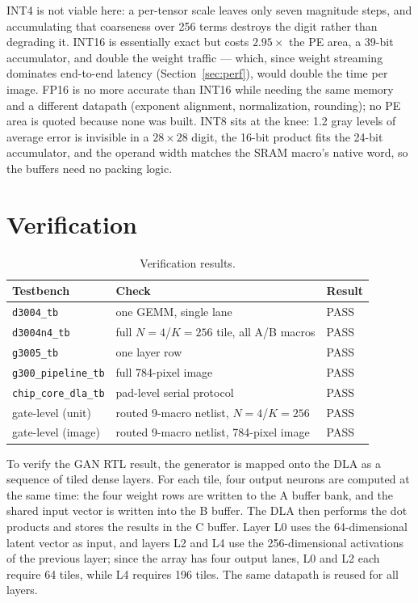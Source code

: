 \documentclass[conference,a4paper]{APSIPA2026}
\begin{document}
INT4 is not viable here: a per-tensor scale leaves only seven magnitude steps, and accumulating that coarseness over 256 terms destroys the digit rather than degrading it. INT16 is essentially exact but costs $2.95\times$ the PE area, a 39-bit accumulator, and double the weight traffic --- which, since weight streaming dominates end-to-end latency (Section~\ref{sec:perf}), would double the time per image. FP16 is no more accurate than INT16 while needing the same memory and a different datapath (exponent alignment, normalization, rounding); no PE area is quoted because none was built. INT8 sits at the knee: 1.2 gray levels of average error is invisible in a $28\times28$ digit, the 16-bit product fits the 24-bit accumulator, and the operand width matches the SRAM macro's native word, so the buffers need no packing logic.

\section{Verification}\label{sec:map}

\begin{table}[!ht]
\caption{Verification results.}
\label{tab:verif}
\centering
\renewcommand{\arraystretch}{1.08}
\begin{tabular}{@{}lll@{}}
\toprule
Testbench & Check & Result \\
\midrule
\texttt{d3004\_tb} & one GEMM, single lane & PASS \\
\texttt{d3004n4\_tb} & full $N{=}4$/$K{=}256$ tile, all A/B macros & PASS \\
\texttt{g3005\_tb} & one layer row & PASS \\
\texttt{g300\_pipeline\_tb} & full 784-pixel image & PASS \\
\texttt{chip\_core\_dla\_tb} & pad-level serial protocol & PASS \\
gate-level (unit) & routed 9-macro netlist, $N{=}4$/$K{=}256$ & PASS \\
gate-level (image) & routed 9-macro netlist, 784-pixel image & PASS \\
\bottomrule
\end{tabular}
\end{table}

To verify the GAN RTL result, the generator is mapped onto the DLA as a sequence of tiled dense layers. For each tile, four output neurons are computed at the same time: the four weight rows are written to the A buffer bank, and the shared input vector is written into the B buffer. The DLA then performs the dot products and stores the results in the C buffer. Layer L0 uses the 64-dimensional latent vector as input, and layers L2 and L4 use the 256-dimensional activations of the previous layer; since the array has four output lanes, L0 and L2 each require 64 tiles, while L4 requires 196 tiles. The same datapath is reused for all layers.
\end{document}
